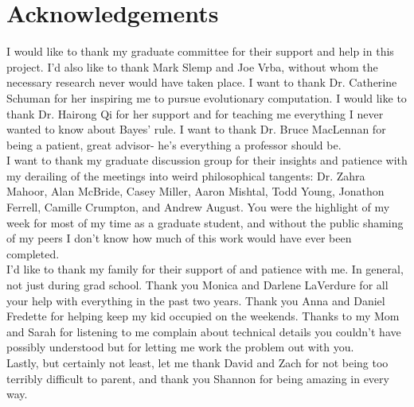 \chapter*{Acknowledgements}
I would like to thank my graduate committee for their support and help in this project.  I'd also like to thank Mark Slemp and Joe Vrba, without whom the necessary research never would have taken place.  I want to thank Dr. Catherine Schuman for her inspiring me to pursue evolutionary computation. I would like to thank Dr. Hairong Qi for her support and for teaching me everything I never wanted to know about Bayes' rule.  I want to thank Dr. Bruce MacLennan for being a patient, great advisor- he's everything a professor should be.
\\I want to thank my graduate discussion group for their insights and patience with my derailing of the meetings into weird philosophical tangents: Dr. Zahra Mahoor, Alan McBride, Casey Miller, Aaron Mishtal, Todd Young, Jonathon Ferrell, Camille Crumpton, and Andrew August.  You were the highlight of my week for most of my time as a graduate student, and without the public shaming of my peers I don't know how much of this work would have ever been completed.\\
I'd like to thank my family for their support of and patience with me.  In general, not just during grad school.  Thank you Monica and Darlene LaVerdure for all your help with everything in the past two years.  Thank you Anna and Daniel Fredette for helping keep my kid occupied on the weekends.  Thanks to my Mom and Sarah for listening to me complain about technical details you couldn't have possibly understood but for letting me work the problem out with you. \\
Lastly, but certainly not least, let me thank David and Zach for not being too terribly difficult to parent, and thank you Shannon for being amazing in every way.  